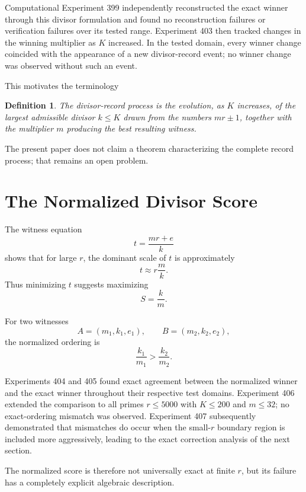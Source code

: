 \documentclass[11pt,a4paper]{article}
\newtheorem{definition}{Definition}
\begin{document}
Computational Experiment 399 independently reconstructed the exact winner through this divisor formulation and found no reconstruction failures or verification failures over its tested range. Experiment 403 then tracked changes in the winning multiplier as $K$ increased. In the tested domain, every winner change coincided with the appearance of a new divisor-record event; no winner change was observed without such an event.

This motivates the terminology
\begin{definition}
The \emph{divisor-record process} is the evolution, as $K$ increases, of the largest admissible divisor $k\le K$ drawn from the numbers $mr\pm1$, together with the multiplier $m$ producing the best resulting witness.
\end{definition}

The present paper does not claim a theorem characterizing the complete record process; that remains an open problem.

\section{The Normalized Divisor Score}

The witness equation
\[
    t=\frac{mr+e}{k}
\]
shows that for large $r$, the dominant scale of $t$ is approximately
\[
    t\approx r\frac{m}{k}.
\]
Thus minimizing $t$ suggests maximizing
\begin{equation}
    \boxed{
    S=\frac{k}{m}.
    }
\end{equation}

For two witnesses
\[
    A=(m_1,k_1,e_1),
    \qquad
    B=(m_2,k_2,e_2),
\]
the normalized ordering is
\begin{equation}
    \frac{k_1}{m_1}>\frac{k_2}{m_2}.
\end{equation}

Experiments 404 and 405 found exact agreement between the normalized winner and the exact winner throughout their respective test domains. Experiment 406 extended the comparison to all primes $r\le5000$ with $K\le200$ and $m\le32$; no exact-ordering mismatch was observed. Experiment 407 subsequently demonstrated that mismatches do occur when the small-$r$ boundary region is included more aggressively, leading to the exact correction analysis of the next section.

The normalized score is therefore not universally exact at finite $r$, but its failure has a completely explicit algebraic description.
\end{document}
